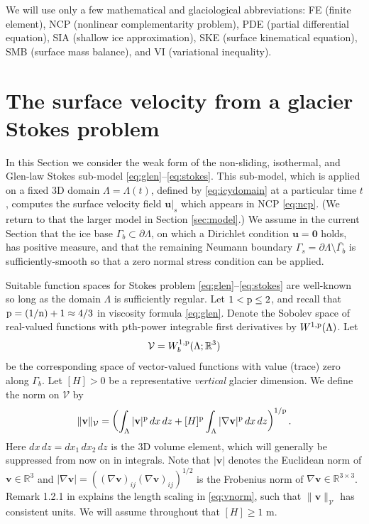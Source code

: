 \documentclass[hidelinks,onefignum,onetabnum,final]{siamart220329}  %
\newcommand{\RR}{\mathbb{R}}
\newcommand{\grad}{\nabla}
\newcommand{\bu}{\mathbf{u}}
\newcommand{\bv}{\mathbf{v}}
\newcommand{\bzero}{\bm{0}}
\newcommand{\cV}{\mathcal{V}}
\newcommand{\nn}{{\text{\textnormal{n}}}}
\newcommand{\pp}{{\text{\textnormal{p}}}}
\begin{document}
We will use only a few mathematical and glaciological abbreviations: FE (finite element), NCP (nonlinear complementarity problem), PDE (partial differential equation), SIA (shallow ice approximation), SKE (surface kinematical equation), SMB (surface mass balance), and VI (variational inequality).


\section{The surface velocity from a glacier Stokes problem} \label{sec:stokes}

In this Section we consider the weak form of the non-sliding, isothermal, and Glen-law Stokes sub-model \eqref{eq:glen}--\eqref{eq:stokes}.  This sub-model, which is applied on a fixed 3D domain $\Lambda = \Lambda(t)$, defined by \eqref{eq:icydomain} at a particular time $t$, computes the surface velocity field $\bu|_s$ which appears in NCP \eqref{eq:ncp}.  (We return to that the larger model in Section \ref{sec:model}.)  We assume in the current Section that the ice base $\Gamma_b\subset\partial \Lambda$, on which a Dirichlet condition $\bu=\bzero$ holds, has positive measure, and that the remaining Neumann boundary $\Gamma_s = \partial \Lambda \setminus \overline{\Gamma_b}$ is sufficiently-smooth so that a zero normal stress condition can be applied.

Suitable function spaces for Stokes problem \eqref{eq:glen}--\eqref{eq:stokes} are well-known so long as the domain $\Lambda$ is sufficiently regular.  Let $1 < \pp \le 2$, and recall that $\pp=(1/\nn)+1\approx 4/3$ in viscosity formula \eqref{eq:glen}.  Denote the Sobolev space \cite{Evans2010} of real-valued functions with $\pp$th-power integrable first derivatives by $W^{1,\pp}(\Lambda)$.  Let
\begin{equation}
\cV = W_b^{1,\pp}(\Lambda; \RR^3) \label{eq:defineV}
\end{equation}
be the corresponding space of vector-valued functions with value (trace) zero along $\Gamma_b$.  Let $[H]>0$ be a representative \emph{vertical} glacier dimension.  We define the norm on $\cV$ by
\begin{equation}
\|\bv\|_{\cV} = \left(\int_\Lambda |\bv|^\pp\,dx\,dz + [H]^\pp \int_\Lambda |\grad\bv|^\pp\,dx\,dz\right)^{1/\pp}. \label{eq:vnorm}
\end{equation}
Here $dx\,dz = dx_1\,dx_2\,dz$ is the 3D volume element, which will generally be suppressed from now on in integrals.  Note that $|\bv|$ denotes the Euclidean norm of $\bv\in\RR^3$ and $|\grad\bv|=\left((\grad\bv)_{ij} (\grad\bv)_{ij}\right)^{1/2}$ is the Frobenius norm of $\grad\bv\in\RR^{3\times 3}$.  Remark 1.2.1 in \cite{BoffiBrezziFortin2013} explains the length scaling in \eqref{eq:vnorm}, such that $\|\bv\|_{\cV}$ has consistent units.  We will assume throughout that $[H] \ge 1$ m.
\end{document}
